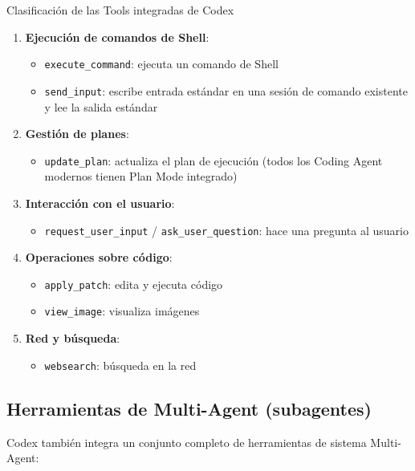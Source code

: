 \begin{importantbox}{Clasificación de las Tools integradas de Codex}
\begin{enumerate}
    \item \textbf{Ejecución de comandos de Shell}:
    \begin{itemize}
        \item \texttt{execute\_command}: ejecuta un comando de Shell
        \item \texttt{send\_input}: escribe entrada estándar en una sesión de comando existente y lee la salida estándar
    \end{itemize}
    \item \textbf{Gestión de planes}:
    \begin{itemize}
        \item \texttt{update\_plan}: actualiza el plan de ejecución (todos los Coding Agent modernos tienen Plan Mode integrado)
    \end{itemize}
    \item \textbf{Interacción con el usuario}:
    \begin{itemize}
        \item \texttt{request\_user\_input} / \texttt{ask\_user\_question}: hace una pregunta al usuario
    \end{itemize}
    \item \textbf{Operaciones sobre código}:
    \begin{itemize}
        \item \texttt{apply\_patch}: edita y ejecuta código
        \item \texttt{view\_image}: visualiza imágenes
    \end{itemize}
    \item \textbf{Red y búsqueda}:
    \begin{itemize}
        \item \texttt{websearch}: búsqueda en la red
    \end{itemize}
\end{enumerate}
\end{importantbox}

\subsection{Herramientas de Multi-Agent (subagentes)}

Codex también integra un conjunto completo de herramientas de sistema Multi-Agent:

